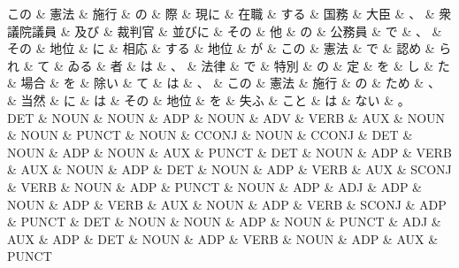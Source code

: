 \documentclass[tikz,border=5pt]{standalone}
\begin{document}
\fontsize{5pt}{6pt}\selectfont
\begin{dependency}[edge unit distance=12.0pt]
    \begin{deptext}[column sep=0.3em]
        この \& 憲法 \& 施行 \& の \& 際 \& 現に \& 在職 \& する \& 国務 \& 大臣 \& 、 \& 衆議院議員 \& 及び \& 裁判官 \& 並びに \& その \& 他 \& の \& 公務員 \& で \& 、 \& その \& 地位 \& に \& 相応 \& する \& 地位 \& が \& この \& 憲法 \& で \& 認め \& られ \& て \& ゐる \& 者 \& は \& 、 \& 法律 \& で \& 特別 \& の \& 定 \& を \& し \& た \& 場合 \& を \& 除い \& て \& は \& 、 \& この \& 憲法 \& 施行 \& の \& ため \& 、 \& 当然 \& に \& は \& その \& 地位 \& を \& 失ふ \& こと \& は \& ない \& 。\\
        DET \& NOUN \& NOUN \& ADP \& NOUN \& ADV \& VERB \& AUX \& NOUN \& NOUN \& PUNCT \& NOUN \& CCONJ \& NOUN \& CCONJ \& DET \& NOUN \& ADP \& NOUN \& AUX \& PUNCT \& DET \& NOUN \& ADP \& VERB \& AUX \& NOUN \& ADP \& DET \& NOUN \& ADP \& VERB \& AUX \& SCONJ \& VERB \& NOUN \& ADP \& PUNCT \& NOUN \& ADP \& ADJ \& ADP \& NOUN \& ADP \& VERB \& AUX \& NOUN \& ADP \& VERB \& SCONJ \& ADP \& PUNCT \& DET \& NOUN \& NOUN \& ADP \& NOUN \& PUNCT \& ADJ \& AUX \& ADP \& DET \& NOUN \& ADP \& VERB \& NOUN \& ADP \& AUX \& PUNCT\\
    \end{deptext}
\end{dependency}
\end{document}

